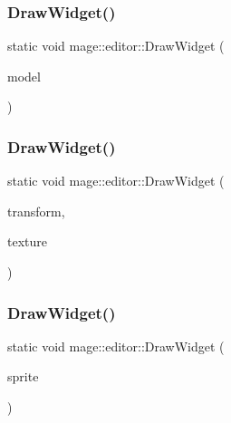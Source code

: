 \hypertarget{namespacemage_1_1editor_a3cc4349fe745bfbb06d4a662fc6c1437}{}\label{namespacemage_1_1editor_a3cc4349fe745bfbb06d4a662fc6c1437} 
\subsubsection{\texorpdfstring{Draw\+Widget()}{DrawWidget()}\hspace{0.1cm}{\footnotesize\ttfamily [15/20]}}
{\footnotesize\ttfamily static void mage\+::editor\+::\+Draw\+Widget (\begin{DoxyParamCaption}\item[{\hyperlink{classmage_1_1_model}{Model} \&}]{model }\end{DoxyParamCaption})\hspace{0.3cm}{\ttfamily [static]}}

\hypertarget{namespacemage_1_1editor_af9c4d46afaf6441cb6da8eef2bf5ac67}{}\label{namespacemage_1_1editor_af9c4d46afaf6441cb6da8eef2bf5ac67} 
\subsubsection{\texorpdfstring{Draw\+Widget()}{DrawWidget()}\hspace{0.1cm}{\footnotesize\ttfamily [16/20]}}
{\footnotesize\ttfamily static void mage\+::editor\+::\+Draw\+Widget (\begin{DoxyParamCaption}\item[{\hyperlink{classmage_1_1_sprite_transform}{Sprite\+Transform} \&}]{transform,  }\item[{I\+D3\+D11\+Shader\+Resource\+View $\ast$}]{texture }\end{DoxyParamCaption})\hspace{0.3cm}{\ttfamily [static]}}

\hypertarget{namespacemage_1_1editor_ac52d7465a1b9bc40a1b446decc7bd4b3}{}\label{namespacemage_1_1editor_ac52d7465a1b9bc40a1b446decc7bd4b3} 
\subsubsection{\texorpdfstring{Draw\+Widget()}{DrawWidget()}\hspace{0.1cm}{\footnotesize\ttfamily [17/20]}}
{\footnotesize\ttfamily static void mage\+::editor\+::\+Draw\+Widget (\begin{DoxyParamCaption}\item[{\hyperlink{classmage_1_1_sprite_image}{Sprite\+Image} \&}]{sprite }\end{DoxyParamCaption})\hspace{0.3cm}{\ttfamily [static]}}

